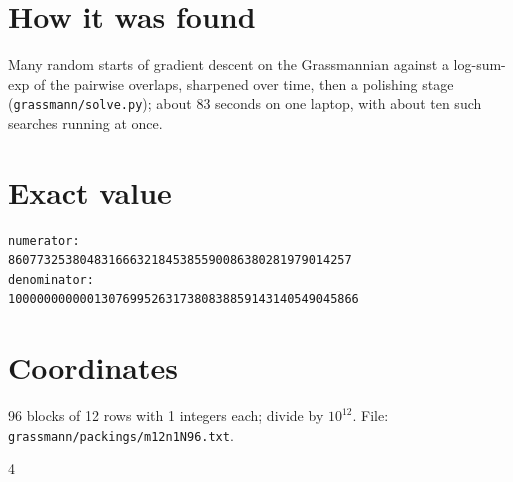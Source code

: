 \documentclass[11pt,a4paper]{article}
\begin{document}
\section{How it was found}
Many random starts of gradient descent on the Grassmannian against a log-sum-exp of the pairwise overlaps, sharpened over time, then a polishing stage (\texttt{grassmann/solve.py}); about 83 seconds on one laptop, with about ten such searches running at once.


\appendix
\section{Exact value}
{\small
\begin{verbatim}
numerator:
860773253804831666321845385590086380281979014257
denominator:
1000000000001307699526317380838859143140549045866
\end{verbatim}}

\section{Coordinates}
96 blocks of 12 rows with 1 integers each; divide by $10^{12}$. File: \texttt{grassmann/packings/m12n1N96.txt}.
{\tiny
\begin{multicols}{4}
\end{multicols}}
\end{document}

